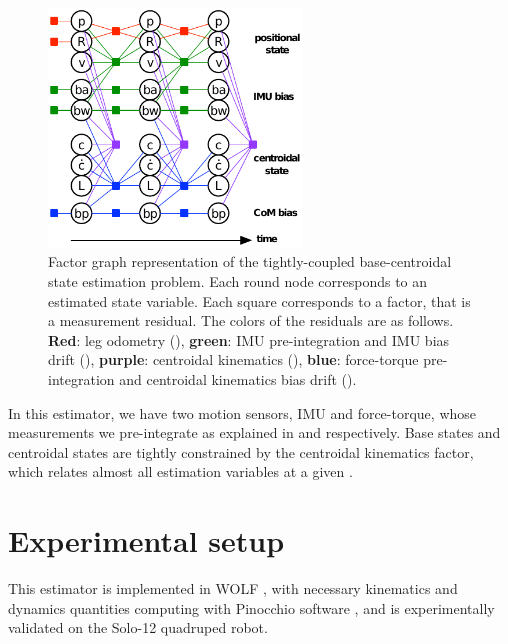 \begin{figure}[t]
    \centering
    \includegraphics[width=0.6\textwidth]{figures/centroidal/centroidal_factor_graph.pdf}
    \caption{Factor graph representation of the tightly-coupled base-centroidal state estimation problem.
             Each round node corresponds to an estimated state variable. Each square corresponds to a factor, that is a measurement residual.
             The colors of the residuals are as follows. \textbf{Red}: leg odometry (), \textbf{green}: IMU pre-integration and IMU bias drift 
             (), \textbf{purple}: centroidal kinematics (), \textbf{blue}: force-torque pre-integration and
             centroidal kinematics bias drift ().
             }
    \label{fig:centroidal_factor_graph}
\end{figure}

In this estimator, we have two motion sensors, IMU and force-torque, whose measurements we pre-integrate as explained in  and
 respectively. Base states and centroidal states are tightly constrained by the centroidal kinematics factor, which relates almost all 
estimation variables at a given \keyframes.

\section{Experimental setup}
\label{eq:expe_setup_centroid}

This estimator is implemented in WOLF \cite{sola2021wolf}, with necessary kinematics and dynamics quantities computing
with Pinocchio software \cite{carpentier2019pinocchio}, and is experimentally validated on the Solo-12 quadruped robot. 

